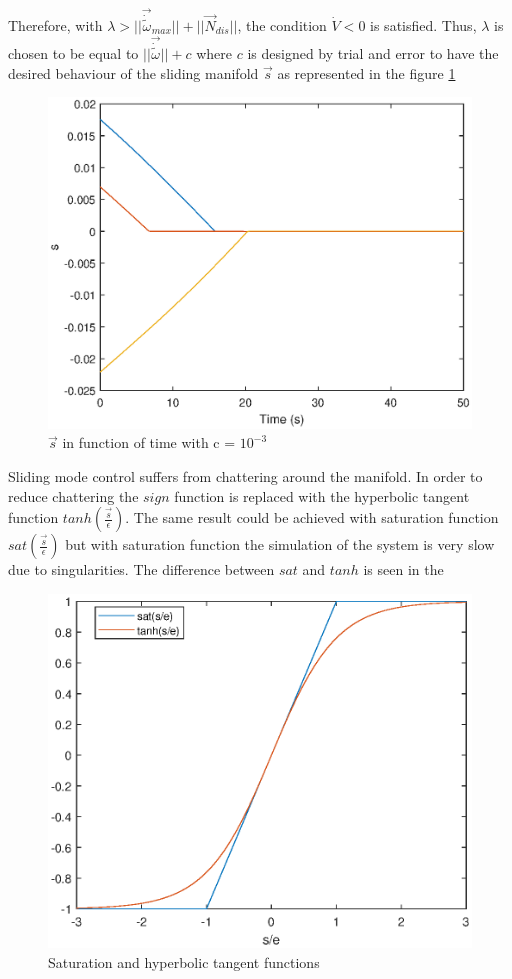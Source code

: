 Therefore, with $\lambda > ||\vec {\dot{\tilde{\omega}}}_{max}|| + ||\vec{N}_{dis}|| $, the condition $\dot {V} <0 $ is satisfied. Thus, $\lambda$ is chosen to be equal to $||\vec{\dot{\tilde{\omega}}}|| + c$ where $c$ is designed by trial and error to have the desired behaviour of the sliding manifold $\vec s$ as represented in the figure \ref{fig:s}
\begin{figure}[H]
	\centering
	\includegraphics[width=0.7\linewidth]{figures/s}
	\caption{$\vec s$ in function of time with c = $10^{-3}$}
	\label{fig:s}
\end{figure}  
%
Sliding mode control suffers from chattering around the manifold. In order to reduce chattering the $sign$ function is replaced with the hyperbolic tangent function $tanh(\frac{\vec s}{\epsilon})$. The same result could be achieved with saturation function $sat(\frac{\vec s}{\epsilon})$ but with saturation function the simulation of the system is very slow due to singularities. The difference between $sat$ and $tanh$ is seen in the  
%
\begin{figure}[H]
	\centering
	\includegraphics[width=0.8\linewidth]{figures/sat_tanh.eps}
	\caption{ Saturation and hyperbolic tangent functions}
	\label{fig:sat_tanh.eps}
\end{figure} 
